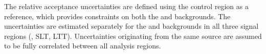 



The relative acceptance uncertainties are defined using the \ZHF
control region as a reference, which provides constraints on both the
\ZHF and \ttbar backgrounds. The uncertainties are estimated
separately for the \ZHF and \ttbar backgrounds in all three signal
regions (\hadhad, \lephad SLT, \lephad LTT). Uncertainties originating
from the same source are assumed to be fully correlated between all
analysis regions.

